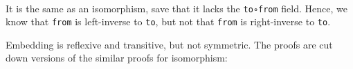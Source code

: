 \begin{fence}
\begin{code}%
\>[0]\AgdaSpace{}%
\AgdaSpace{}%
\<%
\\
\>[0]\AgdaSpace{}%
\AgdaSpace{}%
\AgdaSymbol{(}\AgdaSpace{}%
\AgdaSpace{}%
\AgdaSymbol{:}\AgdaSpace{}%
\AgdaSymbol{)}\AgdaSpace{}%
\AgdaSymbol{:}\AgdaSpace{}%
\AgdaSpace{}%
\<%
\\
\>[0][@{}l@{\AgdaIndent{0}}]%
\>[2]\<%
\\
\>[2][@{}l@{\AgdaIndent{0}}]%
\>[4]%
\>[12]\AgdaSymbol{:}\AgdaSpace{}%
\AgdaSpace{}%
\AgdaSpace{}%
\<%
\\
%
\>[4]%
\>[12]\AgdaSymbol{:}\AgdaSpace{}%
\AgdaSpace{}%
\AgdaSpace{}%
\<%
\\
%
\>[4]\AgdaSpace{}%
\AgdaSymbol{:}\AgdaSpace{}%
\AgdaSpace{}%
\AgdaSymbol{(}\AgdaSpace{}%
\AgdaSymbol{:}\AgdaSpace{}%
\AgdaSymbol{)}\AgdaSpace{}%
\AgdaSpace{}%
\AgdaSpace{}%
\AgdaSymbol{(}\AgdaSpace{}%
\AgdaSymbol{)}\AgdaSpace{}%
\AgdaSpace{}%
\<%
\\
\>[0]\AgdaSpace{}%
\<%
\end{code}
\end{fence}

It is the same as an isomorphism, save that it lacks the
\texttt{to∘from} field. Hence, we know that \texttt{from} is
left-inverse to \texttt{to}, but not that \texttt{from} is right-inverse
to \texttt{to}.

Embedding is reflexive and transitive, but not symmetric. The proofs are
cut down versions of the similar proofs for isomorphism:


